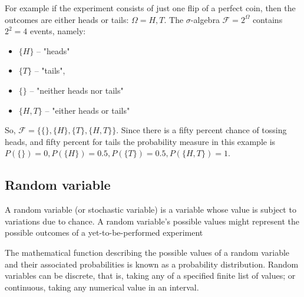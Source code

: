 For example if the experiment consists of just one flip of a perfect coin, then the outcomes are either heads or tails: $\Omega = {H, T}$. The $\sigma$-algebra $\mathcal{F} = 2^{\Omega}$ contains $2^2 = 4$ events, namely:
\begin{itemize}
\item $\{H\}$ – "heads"
\item $\{T\}$ – "tails",
\item $\{\}$ – "neither heads nor tails"
\item $\{H,T\}$ – "either heads or tails"
\end{itemize}
So, $\mathcal{F} = \{\{\}, \{H\}, \{T\}, \{H,T\}\}$. Since there is a fifty percent chance of tossing heads, and fifty percent for tails the probability measure in this example is $P(\{\}) = 0, P(\{H\}) = 0.5, P(\{T\}) = 0.5, P(\{H,T\}) = 1$.

\subsection{Random variable}
A random variable (or stochastic variable) is a variable whose value is subject to variations due to chance. A random variable's possible values might represent the possible outcomes of a yet-to-be-performed experiment

The mathematical function describing the possible values of a random variable and their associated probabilities is known as a probability distribution. Random variables can be discrete, that is, taking any of a specified finite list of values; or continuous, taking any numerical value in an interval.

